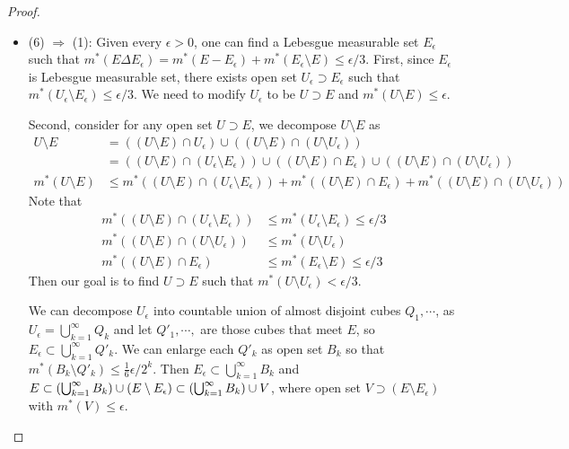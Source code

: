 \documentclass[11pt]{article}
\begin{document}
\begin{itemize}
\begin{proof}
\begin{itemize}
\item (6) $\Rightarrow$ (1): Given  every $\epsilon>0$, one can find a Lebesgue measurable set $E_{\epsilon}$ such that $m^{*}(E\Delta E_{\epsilon}) =m^{*}(E- E_{\epsilon}) + m^{*}(E_{\epsilon}  \setminus  E) \le \epsilon/3 $. First, since $E_{\epsilon}$ is Lebesgue measurable set, there exists open set $U_{\epsilon}\supset E_{\epsilon}$ such that $m^{*}(U_{\epsilon}  \setminus  E_{\epsilon})\le \epsilon/3$. We need to modify $U_{\epsilon}$ to be $U\supset E$ and $m^{*}(U  \setminus  E)\le \epsilon$.

Second, consider for any open set $U\supset E$, we decompose $U \setminus  E$ as 
\begin{align}
U  \setminus  E&= ((U \setminus E)\cap U_{\epsilon})\cup ((U \setminus E)\cap (U \setminus U_{\epsilon}))\nonumber\\
&= ((U \setminus E)\cap (U_{\epsilon}  \setminus E_{\epsilon}))\cup ((U \setminus E)\cap E_{\epsilon}) \cup ((U \setminus E)\cap (U \setminus U_{\epsilon}))\nonumber\\
m^{*}(U \setminus E)&\le m^{*}((U \setminus E)\cap (U_{\epsilon}  \setminus E_{\epsilon}))+ m^{*}((U \setminus E)\cap E_{\epsilon}) + m^{*}((U \setminus E)\cap (U \setminus U_{\epsilon}))  \label{eqn: mearability_lemma_1}
\end{align}
Note that 
\begin{align}
m^{*}((U \setminus E)\cap (U_{\epsilon}  \setminus E_{\epsilon}))&\le m^{*}(U_{\epsilon}  \setminus E_{\epsilon}) \le \epsilon/3 \nonumber\\
m^{*}((U \setminus E)\cap (U \setminus U_{\epsilon}))&\le m^{*}(U \setminus U_{\epsilon})\nonumber\\
m^{*}((U \setminus E)\cap E_{\epsilon})&\le  m^{*}(E_{\epsilon}  \setminus  E)\le \epsilon/3  \label{eqn: mearability_lemma_2}
\end{align}
Then our goal is to find $U\supset E$ such that $m^{*}(U \setminus U_{\epsilon})< \epsilon/3$.

We can decompose $U_{\epsilon}$ into countable union of almost disjoint cubes $Q_{1},\cdots$, as $U_{\epsilon} = \bigcup_{k=1}^{\infty}Q_{k}$ and let $Q'_{1},\cdots,$ are those cubes that meet $E$, so $ E_{\epsilon} \subset \bigcup_{k=1}^{\infty}Q'_{k}$. We can enlarge each $Q'_{k}$ as open set $B_{k}$ so that $m^{*}(B_{k} \setminus  Q'_{k}) \le \frac{1}{6}\epsilon/2^{k}$. Then $ E_{\epsilon} \subset \bigcup_{k=1}^{\infty}B_{k}$ and $E\subset \left(\bigcup_{k=1}^{\infty}B_{k}\right)\cup (E \setminus E_{\epsilon}) \subset \left(\bigcup_{k=1}^{\infty}B_{k}\right)\cup V$, where open  set  $V\supset (E \setminus E_{\epsilon})$ with $m^{*}(V)\le \epsilon$.


\end{itemize}
\end{proof}
\end{itemize}
\end{document}
